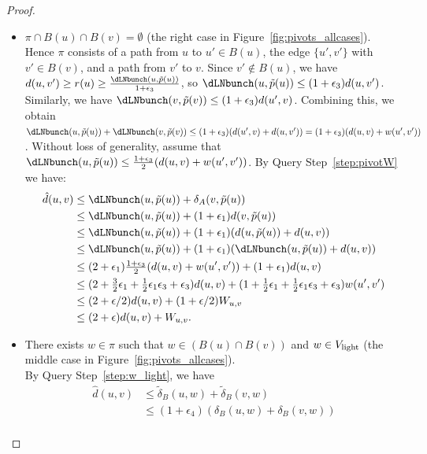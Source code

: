 \begin{proof}
    \begin{itemize}
        \item[Case 2:] $\pi\cap B(u)\cap B(v) =\emptyset$ (the right case in Figure~\ref{fig:pivots_allcases}).\\
        Hence $\pi$ consists of a path from $u$ to $u'\in B(u)$, the edge $\{u',v'\}$ with $v'\in B(v)$, and a path from $v'$ to $v$.
        Since $v'\notin B(u)$, we have $d(u,v')\geq   r(u) \geq \tfrac{\dLNbunch(u,\tilde p(u))}{1+\epsilon_3}$, so $\dLNbunch(u,\tilde p(u))\leq (1+\epsilon_3)d(u,v')$. Similarly, we have $\dLNbunch(v,\tilde p(v))\leq (1+\epsilon_3)d(u',v)$. Combining this, we obtain $\dLNbunch(u,\tilde p(u))+ \dLNbunch(v,\tilde p(v))\leq (1+\epsilon_3)(d(u',v)+d(u,v')) = (1+\epsilon_3)(d(u,v)+w(u',v'))$. Without loss of generality, assume that $\dLNbunch(u,\tilde p(u))\leq  \tfrac{1+\epsilon_3}{2}(d(u,v)+w(u',v'))$.  By Query Step~\ref{step:pivotW} we have:
        \begin{align*} 
            \hat{d}(u,v) &\leq \dLNbunch(u,\tilde p(u))+\delta_A(v,\tilde p(u)) \\
            &\leq \dLNbunch(u,\tilde p(u)) +(1+\epsilon_1)d(v,\tilde p(u))\\
            &\leq \dLNbunch(u,\tilde p(u))+(1+\epsilon_1)(d(u,\tilde p(u))+d(u,v))\\
            &\leq \dLNbunch(u,\tilde p(u))+(1+\epsilon_1)(\dLNbunch(u,\tilde p(u))+d(u,v))\\
            &\leq  (2+\epsilon_1)\tfrac{1+\epsilon_3}{2}(d(u,v)+w(u',v'))+(1+\epsilon_1)d(u,v)\\
            &\leq (2+\tfrac{3}{2}\epsilon_1+\tfrac{1}{2}\epsilon_1\epsilon_3+\epsilon_3)d(u,v)+(1+\tfrac{1}{2}\epsilon_1+\tfrac{1}{2}\epsilon_1\epsilon_3+\epsilon_3)w(u',v') \\
            &\leq (2+\epsilon/2)d(u,v)+(1+\epsilon/2)W_{u,v}\\
            &\leq (2+\epsilon)d(u,v)+W_{u,v}.
        \end{align*}
        \item[Case 3:] 
            There exists $w\in \pi$ such that $w\in (B(u)\cap B(v))$ and $w\in V_{\rm{light}}$ (the middle case in Figure~\ref{fig:pivots_allcases}).\\
            By Query Step~\ref{step:w_light}, we have 
            \begin{align*}
                \hat d(u,v) &\leq \tilde\delta_B(u,w)+\tilde\delta_B(v,w)\\
                &\leq (1+\epsilon_4)(\delta_B(u,w)+\delta_B(v,w))\\

\end{align*}
\end{itemize}
\end{proof}

